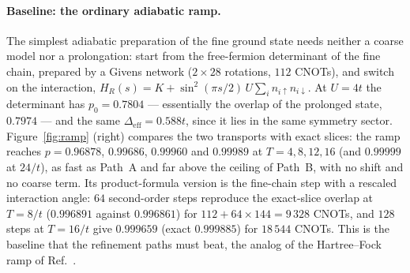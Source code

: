 \documentclass[
  aps,
  prc,
  reprint,
  superscriptaddress,
  floatfix,
  nofootinbib
]{revtex4-2}
\newcommand{\Deff}{\Delta_{\mathrm{eff}}}
\begin{document}
\paragraph{Baseline: the ordinary adiabatic ramp.}
The simplest adiabatic preparation of the fine ground state needs neither a
coarse model nor a prolongation: start from the free-fermion determinant
of the fine chain, prepared by a Givens network ($2\times28$ rotations,
$112$ CNOTs), and switch on the interaction,
$H_R(s)=K+\sin^2(\pi s/2)\,U\sum_in_{i\uparrow}n_{i\downarrow}$.  At
$U=4t$ the determinant has $p_0=0.7804$ --- essentially the overlap of the
prolonged state, $0.7974$ --- and the same $\Deff=0.588t$, since it lies in
the same symmetry sector.  Figure~\ref{fig:ramp} (right) compares the two
transports with exact slices: the ramp reaches $p=0.96878$, $0.99686$,
$0.99960$ and $0.99989$ at $T=4,8,12,16$ (and $0.99999$ at $24/t$), as fast
as Path~A and far above the ceiling of Path~B, with no shift and no
coarse term.  Its product-formula version is the fine-chain step with a
rescaled interaction angle: $64$ second-order steps reproduce the
exact-slice overlap at $T=8/t$ ($0.996891$ against $0.996861$) for
$112+64\times144=9\,328$ CNOTs, and $128$ steps at $T=16/t$ give
$0.999659$ (exact $0.999885$) for $18\,544$ CNOTs.  This is the baseline
that the refinement paths must beat, the analog of the Hartree--Fock
ramp of Ref.~\cite{EigenQPairing2026}.
\end{document}
